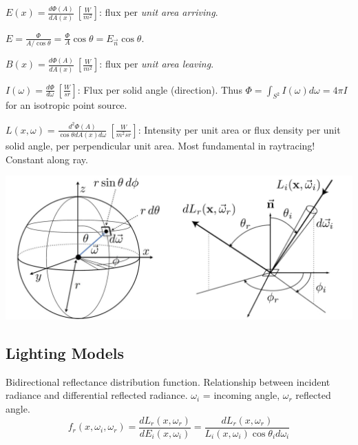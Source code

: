 \begin{definition}[Irradiance]
  \(E(x) = \frac{d \Phi(A)}{d A(x)} \ \left[\frac{W}{m^2}\right]\):
  flux per \textit{unit area arriving}.
\end{definition}

\begin{algorithm}
  \(E =\frac{\Phi}{A / \cos \theta} = \frac{\Phi}{A} \cos \theta = E_{\vec{n}} \cos \theta\).
\end{algorithm}

\begin{definition}[Radiosity]
  \(B(x) = \frac{d\Phi(A)}{dA(x)} \ \left[\frac{W}{m^2}\right]\):
  flux per \textit{unit area leaving}.
\end{definition}

\begin{definition}[Intensity]
  \(I(\omega) = \frac{d\Phi}{d\omega} \ \left[\frac{W}{sr}\right]\):
  Flux per solid angle (direction). Thus \(\Phi = \int_{S^2} I(\omega) d\omega = 4 \pi I\) for an isotropic point source.
\end{definition}

\begin{definition}[Radiance]
  \(L(x, \omega) = \frac{d^2 \Phi(A)}{\cos \theta dA(x) d\omega} \ \left[\frac{W}{m^2sr}\right]\):
  Intensity per unit area or flux density per unit solid angle, per perpendicular unit area. Most fundamental in raytracing! Constant along ray.
\end{definition}

\includegraphics*[width=\linewidth]{assets/angles.png}

\subsection{Lighting Models}
\begin{definition}[BRDF]
  Bidirectional reflectance distribution function. Relationship between incident radiance and differential reflected radiance. \(\omega_i\) = incoming angle, \(\omega_r\) reflected angle.
  \[f_r(x, \omega_i, \omega_r) = \frac{dL_r(x, \omega_r)}{dE_i(x, \omega_i)} = \frac{dL_r(x, \omega_r)}{L_i(x, \omega_i) \cos \theta_i d\omega_i}\]
\end{definition}

